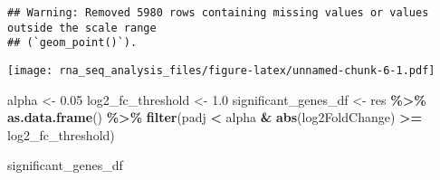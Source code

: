 \documentclass[
]{article}
\newenvironment{Shaded}{\begin{snugshade}}{\end{snugshade}}
\newcommand{\FloatTok}[1]{\textcolor[rgb]{0.00,0.00,0.81}{#1}}
\newcommand{\FunctionTok}[1]{\textcolor[rgb]{0.13,0.29,0.53}{\textbf{#1}}}
\newcommand{\NormalTok}[1]{#1}
\newcommand{\OtherTok}[1]{\textcolor[rgb]{0.56,0.35,0.01}{#1}}
\newcommand{\SpecialCharTok}[1]{\textcolor[rgb]{0.81,0.36,0.00}{\textbf{#1}}}
\begin{document}
\begin{verbatim}
## Warning: Removed 5980 rows containing missing values or values outside the scale range
## (`geom_point()`).
\end{verbatim}

\texttt{[image: rna\_seq\_analysis\_files/figure-latex/unnamed-chunk-6-1.pdf]}

\begin{Shaded}
\begin{Highlighting}[]
\NormalTok{alpha }\OtherTok{\textless{}{-}} \FloatTok{0.05}
\NormalTok{log2\_fc\_threshold }\OtherTok{\textless{}{-}} \FloatTok{1.0}
\NormalTok{significant\_genes\_df }\OtherTok{\textless{}{-}}\NormalTok{ res }\SpecialCharTok{\%\textgreater{}\%}
  \FunctionTok{as.data.frame}\NormalTok{() }\SpecialCharTok{\%\textgreater{}\%}
  \FunctionTok{filter}\NormalTok{(padj }\SpecialCharTok{\textless{}}\NormalTok{ alpha }\SpecialCharTok{\&} \FunctionTok{abs}\NormalTok{(log2FoldChange) }\SpecialCharTok{\textgreater{}=}\NormalTok{ log2\_fc\_threshold)}

\NormalTok{significant\_genes\_df}
\end{Highlighting}
\end{Shaded}
\end{document}
